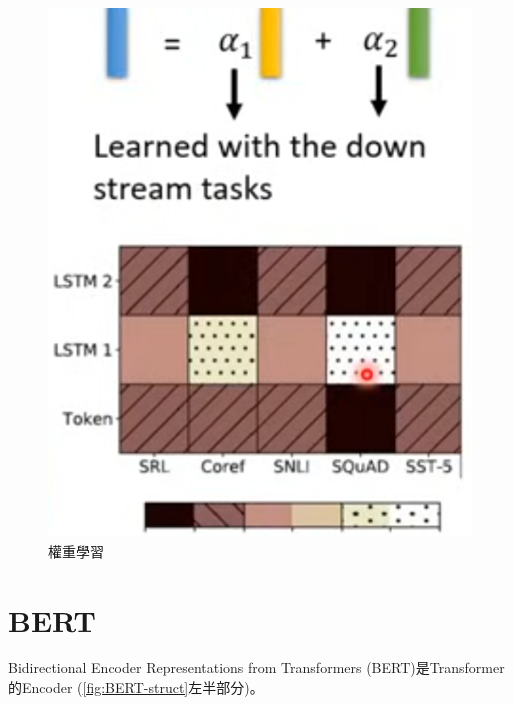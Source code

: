 \begin{figure}[htbp!]
\begin{minipage}[t]{0.2 \linewidth}
        \includegraphics[width=\linewidth]{images/w6/weightedSum.png}
		\caption{權重學習}
    \end{minipage}
\end{figure}
\newpage

\section{BERT}
Bidirectional Encoder Representations from Transformers (BERT)是Transformer的Encoder (\autoref{fig:BERT-struct}左半部分)。

